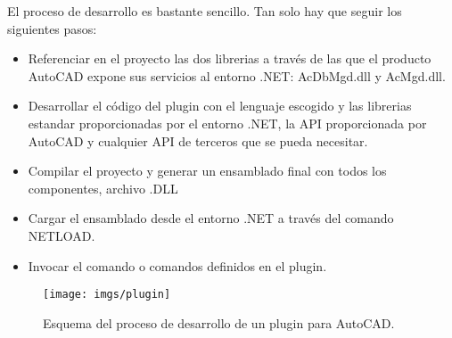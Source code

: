 El proceso de desarrollo es bastante sencillo. Tan solo hay que seguir los siguientes pasos:

\begin{itemize}

\item{Referenciar en el proyecto las dos librerias a través de las que el producto AutoCAD expone sus servicios al entorno .NET: AcDbMgd.dll y AcMgd.dll.}

\item{Desarrollar el código del plugin con el lenguaje escogido y las librerias estandar proporcionadas por el entorno .NET, la API proporcionada por AutoCAD y cualquier API de terceros que se pueda necesitar.}

\item{Compilar el proyecto y generar un ensamblado final con todos los componentes, archivo .DLL}

\item{Cargar el ensamblado desde el entorno .NET a través del comando NETLOAD.}

\item{Invocar el comando o comandos definidos en el plugin.}

\end{itemize}

\begin{figure}[h]
\begin{center}
\texttt{[image: imgs/plugin]}
\caption{Esquema del proceso de desarrollo de un plugin para AutoCAD.}
\end{center}
\end{figure}
